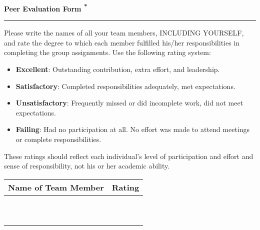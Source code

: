 \documentclass{article}
\begin{document}
\begin{center}
  {\Huge\bfseries Peer Evaluation Form \textsuperscript{*}} %
  \vspace{0.5cm}

  \hrule %
  \vspace{0.5cm}
\end{center}


Please write the names of all your team members, INCLUDING YOURSELF, and rate the degree
to which each member fulfilled his/her responsibilities in completing the group assignments.
Use the following rating system:


\begin{itemize}[leftmargin=*, label=\textbullet]
    \item \textbf{Excellent}: Outstanding contribution, extra effort, and leadership.
    \item \textbf{Satisfactory}: Completed responsibilities adequately, met expectations.
    \item \textbf{Unsatisfactory}: Frequently missed or did incomplete work, did not meet expectations.
    \item \textbf{Failing}: Had no participation at all. No effort was made to attend meetings or complete responsibilities.
\end{itemize}

\vspace{0.5cm}

These ratings should reflect each individual's level of participation and effort and sense of responsibility, not his or her academic ability.

\vspace{0.5cm}

\begin{center}
\begin{tabularx}{0.8\textwidth}{>{\RaggedRight\arraybackslash}X|>{\centering\arraybackslash}X}

\textbf{\Large Name of Team Member} & \textbf{\Large Rating} \\
\hline
\vspace{1.5em} & \\ \\
\hline
\vspace{1.5em} & \\ \\
\hline
\vspace{1.5em} & \\ \\
\hline
\vspace{1.5em} & \\ \\
\hline
\vspace{1.5em} & \\ \\
\hline
\end{tabularx}
\end{center}
\end{document}
